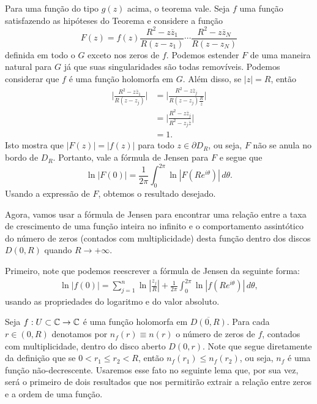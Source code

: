     Para uma função do tipo $g(z)$ acima, o teorema vale. Seja $f$ uma função
    satisfazendo as hipóteses do Teorema e considere a função
    \begin{equation*}
        F(z) = f(z)\frac{R^2 - z\overline{z}_1}{R(z-z_1)}\cdots
        \frac{R^2 - z\overline{z}_N}{R(z-z_N)}
    \end{equation*}
    definida em todo o $G$ exceto nos zeros de $f$. Podemos estender $F$ de uma 
    maneira natural para $G$ já que suas singularidades são todas removíveis. 
    Podemos considerar que  $f$ é uma função holomorfa em $G$. Além disso, se 
    $|z| = R$, então 
    \begin{align*}
        \Big | \frac{R^2 - z\overline{z}_1}{R(z-z_j)} \Big | &= \Big | 
        \frac{R^2 - z\overline{z}_j}{R(z-z_j) \frac{R}{\overline{z}}} \Big | \\
        &= \Big | \frac{R^2 - z\overline{z}_j}{R^2-z_j\overline{z}}  \Big | \\
        &= 1.
    \end{align*}
    Isto mostra que $|F(z)| = |f(z)|$ para todo $z \in \partial D_R$, ou seja, $F$ 
    não se anula no bordo de $D_R$. Portanto, vale a fórmula de Jensen para $F$ e 
    segue que 
    \begin{equation*}
        \ln{|F(0)|} = \frac{1}{2\pi}\int_{0}^{2\pi}\ln{|F(Re^{i\theta})|}\, d\theta .
    \end{equation*}
    Usando a expressão de $F$, obtemos o resultado desejado.
    
    Agora, vamos usar a fórmula de Jensen para encontrar uma relação entre a
    taxa de crescimento de uma função inteira no infinito e o comportamento
    assintótico do número de zeros (contados com multiplicidade) desta
    função dentro dos discos $D(0,R)$ quando $R\to +\infty$.
    
    Primeiro, note que podemos reescrever a fórmula de Jensen da seguinte forma:
    \begin{align*}
        \ln|f(0)| = \sum_{j=1}^n \ln\left|\frac{z_j}{R}\right| 
        + \frac{1}{2\pi}\int_0^{2\pi} \ln|f(Re^{i\theta})| \, d\theta,
    \end{align*}
    usando as propriedades do logaritmo e do valor absoluto.
    
    Seja $f:U\subset\mathbb{C}\to\mathbb{C}$ é uma função holomorfa em $\overline{D(0,R)}$.
    Para cada $r\in (0,R)$ denotamos por $n_f(r) \equiv n(r)$ o número de zeros 
    de $f$, contados com multiplicidade, dentro do disco aberto $D(0,r)$.
    Note que segue diretamente da definição que se $0 < r_1 \leq r_2 < R$, então
    $n_f(r_1) \leq n_f(r_2)$, ou seja, $n_f$ é uma função não-decrescente. Usaremos
    esse fato no seguinte lema que, por sua vez, será o primeiro de dois resultados
    que nos permitirão extrair a relação entre zeros e a ordem de uma função.
    
